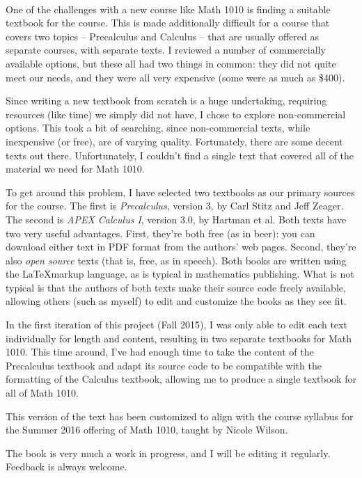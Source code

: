 \thispagestyle{empty}
\Huge
{}\\
\normalsize

One of the challenges with a new course like Math 1010 is finding a suitable textbook for the course. This is made additionally difficult for a course that covers two topics -- Precalculus and Calculus -- that are usually offered as separate courses, with separate texts. I reviewed a number of commercially available options, but these all had two things in common: they did not quite meet our needs, and they were all very expensive (some were as much as \$400).

Since writing a new textbook from scratch is a huge undertaking, requiring resources (like time) we simply did not have, I chose to explore non-commercial options. This took a bit of searching, since non-commercial texts, while inexpensive (or free), are of varying quality. Fortunately, there are some decent texts out there. Unfortunately, I couldn't find a single text that covered all of the material we need for Math 1010.

To get around this problem, I have selected two textbooks as our primary sources for the course. The first is \textit{Precalculus}, version 3, by Carl Stitz and Jeff Zeager. The second is \textit{APEX Calculus I},  version 3.0, by Hartman et al. Both texts have two very useful advantages. First, they're both free (as in beer): you can download either text in PDF format from the authors' web pages. Second, they're also \textit{open source} texts (that is, free, as in speech). Both books are written using the \LaTeX markup language, as is typical in mathematics publishing. What is not typical is that the authors of both texts make their source code freely available, allowing others (such as myself) to edit and customize the books as they see fit.

In the first iteration of this project (Fall 2015), I was only able to edit each text individually for length and content, resulting in two separate textbooks for Math 1010. This time around, I've had enough time to take the content of the Precalculus textbook and adapt its source code to be compatible with the formatting of the Calculus textbook, allowing me to produce a single textbook for all of Math 1010.

This version of the text has been customized to align with the course syllabus for the Summer 2016 offering of Math 1010, taught by Nicole Wilson.

The book is very much a work in progress, and I will be editing it regularly. Feedback is always welcome. 

